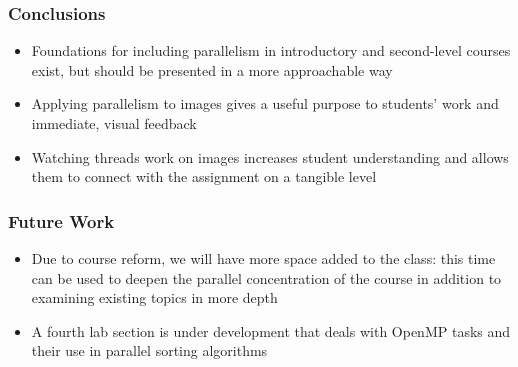 \documentclass[table]{beamer}
\begin{document}
\begin{frame}
    \frametitle{Conclusions}
    \begin{itemize}
    \item Foundations for including parallelism in introductory and second-level
        courses exist, but should be presented in a more approachable way
    \item Applying parallelism to images gives a useful purpose to students’
        work and immediate, visual feedback
    \item Watching threads work on images increases student understanding and
        allows them to connect with the assignment on a tangible level
    \end{itemize}
\end{frame}

\begin{frame}
    \frametitle{Future Work}
    \begin{itemize}
        \item Due to course reform, we will have more space added to the class:
            this time can be used to deepen the parallel concentration of the
            course in addition to examining existing topics in more depth
        \item A fourth lab section is under development that deals with OpenMP
            tasks and their use in parallel sorting algorithms
    \end{itemize}
\end{frame}
\end{document}
